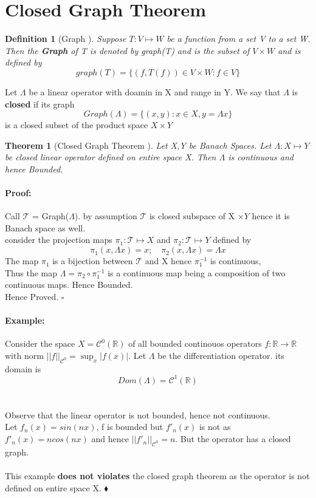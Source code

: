\documentclass{article}
\newenvironment{proof}{\paragraph{Proof:}}{\hfill$\square$}
\newenvironment{example}{\paragraph{Example:}}{\hfill $\blacklozenge $}
\newtheorem{definition}{Definition}[section]
\newtheorem{theorem}{Theorem}[section]
\begin{document}
\section{Closed Graph Theorem}
\begin{definition}[Graph ]
    Suppose $T: V \mapsto W$ be a function from a set V to a set W. Then the \textbf{Graph} of T is denoted by graph(T) and is the subset of $V\times W$ and is defined by $$graph(T) = \{(f,T(f))\in V \times W: f \in V \}$$ 
\end{definition}
Let $\Lambda $ be a linear operator with doamin in X and range in Y. We say that $\Lambda$ is \textbf{closed} if its graph  $$Graph(\Lambda)=\{ (x,y): x\in X, y=\Lambda x  \} $$ is a closed subset of the product space $X \times Y$  
\begin{theorem}[Closed Graph Theorem ]
    Let X,Y be Banach Spaces. Let $\Lambda: X \mapsto Y$ be closed linear operator defined on entire space X. Then $\Lambda$ is continuous and hence Bounded.
\end{theorem}
\begin{proof}
    Call $\mathcal{T}$ = Graph($\Lambda$). by assumption $\mathcal{T}$  is closed subspace of X $\times Y$ hence it is Banach space as well.\\
    consider the projection maps $\pi_1 : \mathcal{T} \mapsto X$ and $\pi_2 : \mathcal{T} \mapsto Y$ defined by $$\pi_1(x,\Lambda x)= x; \quad \pi_2(x,\Lambda x)= \Lambda x $$
    The map $\pi_1$ is a bijection between $\mathcal{T} $ and X hence $\pi_1^{-1}$ is continuous,\\
    Thus the map $\Lambda=\pi_2 \circ \pi_1^{-1}   $ is a continuous map being a composition of two continuous maps. Hence Bounded.\\
    Hence Proved.
\end{proof}

\begin{example}
    Consider the space $X= \mathcal{C}^0(\mathbb{R} ) $ of all bounded continouos operators $f:\mathbb{R} \to \mathbb{R} $ with norm $||f||_{\mathcal{C}^0}= \sup_x |f(x)| $. Let $\Lambda $ be the differentiation operator. its domain is $$Dom(\Lambda)= \mathcal{C}^1(\mathbb{R} ) $$
    \\
    \\ Observe that the linear operator is not bounded, hence not continuous.
    \\ Let $f_n(x)= sin(nx)$, f is bounded but $f'_n(x)$ is not as $f'_n(x)= ncos(nx)$ and hence $||f'_n||_{\mathcal{C}^0}= n $. But the operator has a closed graph. \\
    \\This example \textbf{does not violates} the closed graph theorem as the operator is not defined on entire space X.
\end{example}
\end{document}
